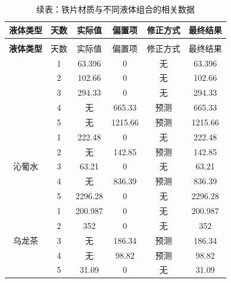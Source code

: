 \documentclass[12pt,a4paper]{ctexart}
\begin{document}
\vspace{1em}

\begin{longtable}{c c c c c c}
  \caption{铁片材质与不同液体组合的相关数据} \\
  \toprule
  \textbf{液体类型} & 天数 & 实际值 & 偏置项 & 修正方式 & 最终结果 \\
  \midrule
  \endfirsthead  %
  
  \caption*{续表：铁片材质与不同液体组合的相关数据} \\
  \toprule
  \textbf{液体类型} & 天数 & 实际值 & 偏置项 & 修正方式 & 最终结果 \\
  \midrule
  \endhead  %
  
  \bottomrule
  \endlastfoot  %

  \multirow{5}{*}{水} 
    & 1 & 63.396   & 0      & 无       & 63.396   \\
    & 2 & 102.66   & 0      & 无       & 102.66   \\
    & 3 & 294.33   & 0      & 无       & 294.33   \\
    & 4 & 无       & 665.33 & 预测     & 665.33   \\
    & 5 & 无       & 1215.66& 预测     & 1215.66  \\
  \midrule
  
  \multirow{5}{*}{沁葡水} 
    & 1 & 222.48   & 0      & 无       & 222.48   \\
    & 2 & 无       & 142.85 & 预测     & 142.85   \\
    & 3 & 63.21    & 0      & 无       & 63.21    \\
    & 4 & 无       & 836.39 & 预测     & 836.39   \\
    & 5 & 2296.28  & 0      & 无       & 2296.28  \\
  \midrule
  
  \multirow{5}{*}{乌龙茶} 
    & 1 & 200.987  & 0      & 无       & 200.987  \\
    & 2 & 352      & 0      & 无       & 352      \\
    & 3 & 无       & 186.34 & 预测     & 186.34   \\
    & 4 & 无       & 98.82  & 预测     & 98.82    \\
    & 5 & 31.09    & 0      & 无       & 31.09    \\

\end{longtable}
\newpage

\end{document}
